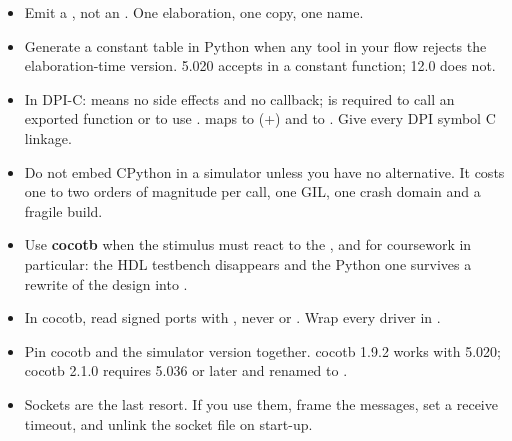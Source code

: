 \begin{itemize}
      the generator and everything it imports, plus a CI job that regenerates
      and diffs.
\item Emit a , not an . One elaboration, one copy,
      one name.
\item Generate a constant table in Python when any tool in your flow rejects
      the elaboration-time version.  5.020 accepts
       in a constant function;  12.0 does not.
\item In DPI-C:  means no side effects and no callback; 
      is required to call an exported function or to use .
       maps to  (+) and
       to . Give every DPI symbol C linkage.
\item Do not embed CPython in a simulator unless you have no alternative. It
      costs one to two orders of magnitude per call, one GIL, one crash
      domain and a fragile build.
\item Use \textbf{cocotb} when the stimulus must react to the \DUT{}, and
      for \VHDL{} coursework in particular: the HDL testbench disappears and
      the Python one survives a rewrite of the design into \SV{}.
\item In cocotb, read signed ports with , never
       or . Wrap every driver in
      .
\item Pin cocotb and the simulator version together. cocotb 1.9.2 works with
       5.020; cocotb 2.1.0 requires 5.036 or later and
      renamed  to .
\item Sockets are the last resort. If you use them, frame the messages, set a
      receive timeout, and unlink the socket file on start-up.
\end{itemize}

